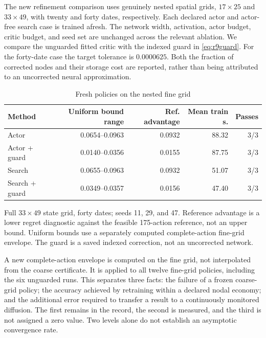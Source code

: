\documentclass[ecta,nameyear,draft]{econsocart}
\theoremstyle{definition}
\theoremstyle{remark}
\begin{document}
The new refinement comparison uses genuinely nested spatial grids, $17\times25$ and $33\times49$, with twenty and forty dates, respectively. Each declared actor and actor-free search case is trained afresh. The network width, activation, actor budget, critic budget, and seed set are unchanged across the relevant ablation. We compare the unguarded fitted critic with the indexed guard in \eqref{eq:r9guard}. For the forty-date case the target tolerance is $0.0000625$. Both the fraction of corrected nodes and their storage cost are reported, rather than being attributed to an uncorrected neural approximation.

\begin{table}[htbp]
\centering\small\setlength{\tabcolsep}{4pt}
\caption{Fresh policies on the nested fine grid}\label{tab:r9nested}
\begin{tabular}{lrrrr}
\toprule
Method & Uniform bound range & Ref. advantage & Mean train s. & Passes \\
\midrule
Actor & 0.0654--0.0963 & 0.0932 & 88.32 & 3/3 \\
Actor + guard & 0.0140--0.0356 & 0.0155 & 87.75 & 3/3 \\
Search & 0.0655--0.0963 & 0.0932 & 51.07 & 3/3 \\
Search + guard & 0.0349--0.0357 & 0.0156 & 47.40 & 3/3 \\
\bottomrule
\end{tabular}
\par\vspace{3pt}\begin{minipage}{0.97\linewidth}\footnotesize Full $33\times49$ state grid, forty dates; seeds 11, 29, and 47. Reference advantage is a lower regret diagnostic against the feasible 175-action reference, not an upper bound. Uniform bounds use a separately computed complete-action fine-grid envelope. The guard is a saved indexed correction, not an uncorrected network.\end{minipage}
\end{table}


A new complete-action envelope is computed on the fine grid, not interpolated from the coarse certificate. It is applied to all twelve fine-grid policies, including the six unguarded runs. This separates three facts: the failure of a frozen coarse-grid policy; the accuracy achieved by retraining within a declared nodal economy; and the additional error required to transfer a result to a continuously monitored diffusion. The first remains in the record, the second is measured, and the third is not assigned a zero value. Two levels alone do not establish an asymptotic convergence rate.
\end{document}
